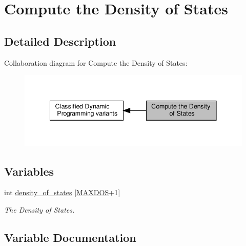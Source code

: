 \hypertarget{group__dos}{}\section{Compute the Density of States}
\label{group__dos}


\subsection{Detailed Description}
Collaboration diagram for Compute the Density of States\+:
\nopagebreak
\begin{figure}[H]
\begin{center}
\leavevmode
\includegraphics[width=341pt]{group__dos}
\end{center}
\end{figure}
\subsection*{Variables}
\begin{DoxyCompactItemize}
\item 
int \hyperlink{group__dos_ga937634a76b46a22530a74906f1957a9e}{density\+\_\+of\+\_\+states} \mbox{[}\hyperlink{subopt_8h_a5ec740b80afb4906ba4311dbd8ddbd89}{M\+A\+X\+D\+OS}+1\mbox{]}
\begin{DoxyCompactList}\small\item\em The Density of States. \end{DoxyCompactList}\end{DoxyCompactItemize}


\subsection{Variable Documentation}
\mbox{\label{group__dos_ga937634a76b46a22530a74906f1957a9e}} 
